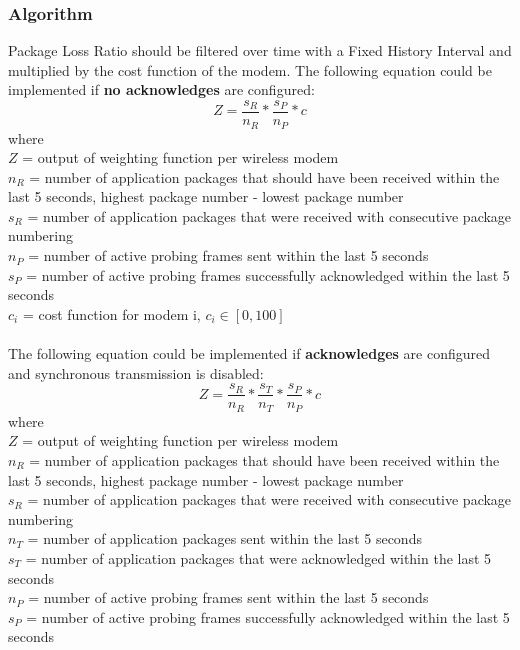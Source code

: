 \subsubsection{Algorithm}
Package Loss Ratio should be filtered over time with a Fixed History Interval and multiplied by the cost function of the modem. The following equation could be implemented if \textbf{no acknowledges} are configured:
\begin{equation}
Z = \frac{s_R}{n_R} * \frac{s_P}{n_P} * c 
\end{equation}
where\\
$Z$ = output of weighting function per wireless modem\\
$n_R$ = number of application packages that should have been received within the last 5 seconds, highest package number - lowest package number\\
$s_R$ = number of application packages that were received with consecutive package numbering\\
$n_P$ = number of active probing frames sent within the last 5 seconds\\
$s_P$ = number of active probing frames successfully acknowledged within the last 5 seconds\\
$c_i$ = cost function for modem i, $c_i \in [0, 100]$\\\\
%
The following equation could be implemented if \textbf{acknowledges} are configured and synchronous transmission is disabled:
\begin{equation}
Z = \frac{s_R}{n_R} * \frac{s_T}{n_T} * \frac{s_P}{n_P} * c
\end{equation}
where\\
$Z$ = output of weighting function per wireless modem\\
$n_R$ = number of application packages that should have been received within the last 5 seconds, highest package number - lowest package number\\
$s_R$ = number of application packages that were received with consecutive package numbering\\
$n_T$ = number of application packages sent within the last 5 seconds\\
$s_T$ = number of application packages that were acknowledged within the last 5 seconds\\
$n_P$ = number of active probing frames sent within the last 5 seconds\\
$s_P$ = number of active probing frames successfully acknowledged within the last 5 seconds\\
